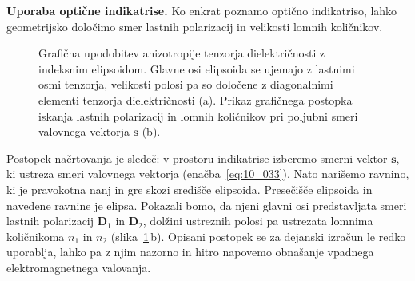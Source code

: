 \begin{example}{\bf Uporaba optične indikatrise.} 
\label{chap:ind2}
Ko enkrat poznamo optično indikatriso, lahko 
geometrijsko določimo smer lastnih polarizacij in velikosti
lomnih količnikov.
\begin{figure}[ht]
\centering
\def\svgwidth{120truemm} 

\caption{Grafična upodobitev anizotropije tenzorja dielektričnosti z indeksnim
elipsoidom. Glavne osi elipsoida se ujemajo z lastnimi osmi tenzorja, velikosti
polosi pa so določene z  diagonalnimi elementi tenzorja dielektričnosti (a). Prikaz grafičnega
postopka iskanja lastnih polarizacij in lomnih količnikov pri poljubni smeri valovnega
vektorja $\mathbf{s}$ (b).}
\label{fig:10_indikatrisa}
\end{figure}
Postopek načrtovanja je sledeč: v prostoru indikatrise izberemo smerni 
vektor $\mathbf{s}$, ki ustreza smeri valovnega vektorja (enačba~\ref{eq:10_033}). Nato 
narišemo ravnino, ki je pravokotna nanj in gre skozi središče elipsoida. 
Presečišče elipsoida in navedene ravnine je elipsa. Pokazali bomo, da njeni 
glavni osi predstavljata smeri lastnih polarizacij $\mathbf{D}_{1}$ in 
$\mathbf{D}_{2}$, dolžini ustreznih polosi pa ustrezata lomnima količnikoma 
$n_1$ in $n_2$ (slika~\ref{fig:10_indikatrisa}\,b). Opisani postopek se za dejanski 
izračun le redko uporablja, lahko pa z njim  
nazorno in hitro napovemo obnašanje vpadnega elektromagnetnega valovanja. 


\end{example}
